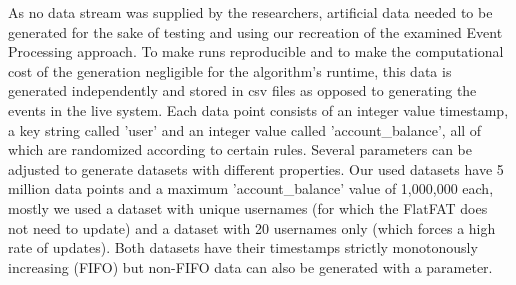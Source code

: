 As no data stream was supplied by the researchers, artificial data needed to be generated
for the sake of testing and using our recreation of the examined Event Processing approach.
To make runs reproducible and to make the computational cost of the generation negligible
for the algorithm's runtime, this data is generated independently and stored in csv files
as opposed to generating the events in the live system.
Each data point consists of an integer value timestamp, a key string called 'user' and
an integer value called 'account\_balance', all of which are randomized according to certain rules.
Several parameters can be adjusted to generate datasets with different properties.
Our used datasets have 5 million data points and a maximum 'account\_balance' value of 1,000,000 each,
mostly we used a dataset with unique usernames
(for which the FlatFAT does not need to update) and a dataset with 20 usernames only
(which forces a high rate of updates).
Both datasets have their timestamps strictly monotonously increasing (FIFO)
but non-FIFO data can also be generated with a parameter.